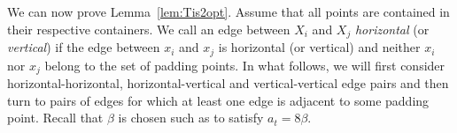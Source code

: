 \documentclass[11pt,DIV=12,a4paper]{scrartcl}
\newtheorem{lemma}[claim]{Lemma}
\newcommand{\norm}[1]{\left\Vert #1 \right\Vert}
\begin{document}

We can now prove Lemma~\ref{lem:Tis2opt}. Assume that all points are contained in their respective containers. We call an edge between $X_i$ and $X_j$ \emph{horizontal} (or \emph{vertical}) if the edge between $x_i$ and $x_j$ is horizontal (or vertical) and neither $x_i$ nor $x_j$ belong to the set of padding points.
In what follows, we will first consider horizontal-horizontal, horizontal-vertical and vertical-vertical edge pairs and then turn to pairs of edges for which at least one edge is adjacent to some padding point. Recall that $\beta$ is chosen such as to satisfy $a_t = 8\beta$. %


\end{document}
